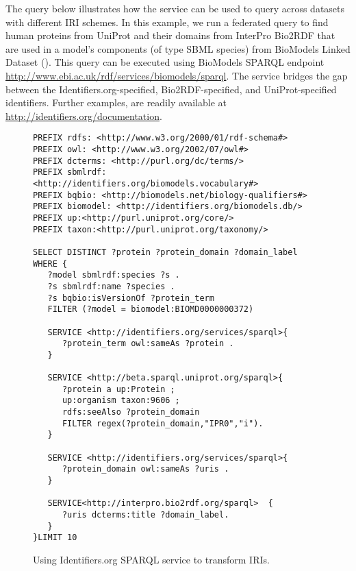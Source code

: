 \documentclass{bioinfo}
\begin{document}
The query below illustrates how the service can be used to query across datasets with different IRI schemes. In this example, we run a federated query to find human proteins from UniProt and their domains from InterPro Bio2RDF that are used in a model's components (of type SBML species) from BioModels Linked Dataset (\cite{Wimalaratne2014}). This query can be executed using BioModels SPARQL endpoint \href{http://www.ebi.ac.uk/rdf/services/biomodels/sparql}{http://www.ebi.ac.uk/rdf/services/biomodels/sparql}. The service bridges the gap between the Identifiers.org-specified, Bio2RDF-specified, and UniProt-specified identifiers. Further examples, are readily available at \href{http://identifiers.org/documentation}{http://identifiers.org/documentation}.

\begin{figure}[h]
{\scriptsize
\begin{verbatim}
PREFIX rdfs: <http://www.w3.org/2000/01/rdf-schema#>
PREFIX owl: <http://www.w3.org/2002/07/owl#>
PREFIX dcterms: <http://purl.org/dc/terms/>
PREFIX sbmlrdf: <http://identifiers.org/biomodels.vocabulary#>
PREFIX bqbio: <http://biomodels.net/biology-qualifiers#>
PREFIX biomodel: <http://identifiers.org/biomodels.db/>
PREFIX up:<http://purl.uniprot.org/core/> 
PREFIX taxon:<http://purl.uniprot.org/taxonomy/> 

SELECT DISTINCT ?protein ?protein_domain ?domain_label WHERE {
   ?model sbmlrdf:species ?s . 
   ?s sbmlrdf:name ?species .
   ?s bqbio:isVersionOf ?protein_term 
   FILTER (?model = biomodel:BIOMD0000000372)

   SERVICE <http://identifiers.org/services/sparql>{
      ?protein_term owl:sameAs ?protein .
   }

   SERVICE <http://beta.sparql.uniprot.org/sparql>{
      ?protein a up:Protein ; 
      up:organism taxon:9606 ;
      rdfs:seeAlso ?protein_domain 
      FILTER regex(?protein_domain,"IPR0","i").
   }

   SERVICE <http://identifiers.org/services/sparql>{
      ?protein_domain owl:sameAs ?uris .
   }

   SERVICE<http://interpro.bio2rdf.org/sparql>  {
      ?uris dcterms:title ?domain_label.
   }      
}LIMIT 10
\end{verbatim}
}
\caption{Using Identifiers.org SPARQL service to transform IRIs.}
\label{example1}
\end{figure}
   
\end{document}
